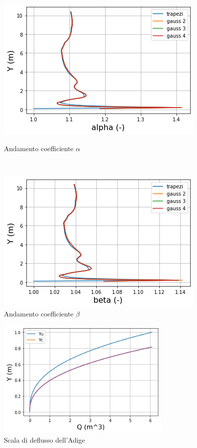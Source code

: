 \documentclass[12pt]{article} %
\begin{document}
\begin{figure}[H]
\begin{minipage}[b]{8.5cm}
\centering
    \includegraphics[width=1 \textwidth]{alphaadi.png}
    \caption{Andamento coefficiente $\alpha$}
    \label{fig:Adige_alfa}
\end{minipage}
\ \hspace{2mm} \hspace{3mm} \
\begin{minipage}[b]{8.5cm}
    \centering
    \includegraphics[width=1 \textwidth]{betaadi.png}
    \caption{Andamento coefficiente $\beta$}
    \label{fig:Adige_beta}
\end{minipage}
\end{figure}

\begin{figure} [H]
    \centering
    \includegraphics[width=8.5cm]{deflussotri.png}
    \caption{Scala di deflusso dell'Adige}
    \label{fig:Adige_scala_deflusso}
\end{figure}
\end{document}

